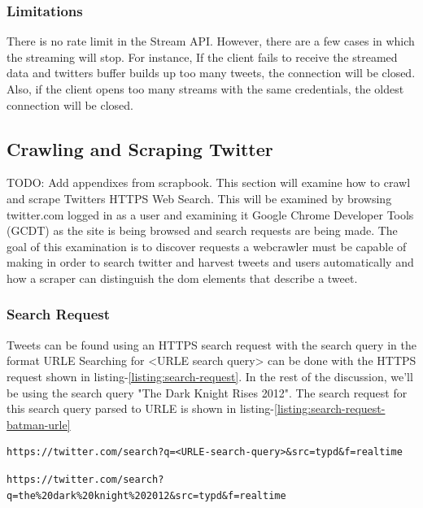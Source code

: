 \subsubsection{Limitations}
There is no rate limit in the Stream API. However, there are a few cases in which the streaming will stop. For instance, If the client fails to receive the streamed data and twitters buffer builds up too many tweets, the connection will be closed. Also, if the client opens too many streams with the same credentials, the oldest connection will be closed.

\subsection{Crawling and Scraping Twitter}
TODO: Add appendixes from scrapbook.
This section will examine how to crawl and scrape Twitters HTTPS Web Search. This will be examined by browsing twitter.com logged in as a user and examining it Google Chrome Developer Tools (GCDT)\cite{gcdt} as the site is being browsed and search requests are being made. The goal of this examination is to discover requests a webcrawler must be capable of making in order to search twitter and harvest tweets and users automatically and how a scraper can distinguish the dom elements that describe a tweet.


\subsubsection{Search Request}
Tweets can be found using an HTTPS search request with the search query in the format URLE \cite{w3-urle-ref}
Searching for <URLE search query> can be done with the HTTPS request shown in listing-\ref{listing:search-request}.
In the rest of the discussion, we'll be using the search query "The Dark Knight Rises 2012". The search request for this search query parsed to URLE is shown in listing-\ref{listing:search-request-batman-urle}

  \begin{lstlisting}[caption={URL of a twitter HTTPS search request for <URLE-search-query>},label={listing:search-request},captionpos=b]
  https://twitter.com/search?q=<URLE-search-query>&src=typd&f=realtime
  \end{lstlisting}

\begin{lstlisting}[caption={URL of a twitter HTTPS search request for "The Dark Knight Rises 2012" parsed to URLE},label={listing:search-request-batman-urle},captionpos=b]
  https://twitter.com/search?q=the%20dark%20knight%202012&src=typd&f=realtime
  \end{lstlisting}


